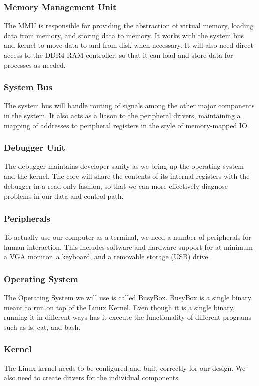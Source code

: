 \documentclass{article}
\begin{document}
    \subsubsection{Memory Management Unit}
    The MMU is responsible for providing the abstraction of virtual memory, loading data from memory, and storing data to memory.  It works with the system bus and kernel to move data to and from disk when necessary.  It will also need direct access to the DDR4 RAM controller, so that it can load and store data for processes as needed.
    
    \subsubsection{System Bus}
    The system bus will handle routing of signals among the other major components in the system.  It also acts as a liason to the peripheral drivers, maintaining a mapping of addresses to peripheral registers in the style of memory-mapped IO.
    
    \subsubsection{Debugger Unit}
    The debugger maintains developer sanity as we bring up the operating system and the kernel.  The core will share the contents of its internal registers with the debugger in a read-only fashion, so that we can more effectively diagnose problems in our data and control path.

    \subsubsection{Peripherals}
    To actually use our computer as a terminal, we need a number of peripherals for human interaction.  This includes software and hardware support for at minimum a VGA monitor, a keyboard, and a removable storage (USB) drive.
    
    \subsubsection{Operating System}
    The Operating System we will use is called BusyBox. BusyBox is a single binary meant to run on top of the Linux Kernel. Even though it is a single binary, running it in different ways has it execute the functionality of different programs such as ls, cat, and bash.
    
    \subsubsection{Kernel}
    The Linux kernel needs to be configured and built correctly for our design. We also need to create drivers for the individual components.
\end{document}
